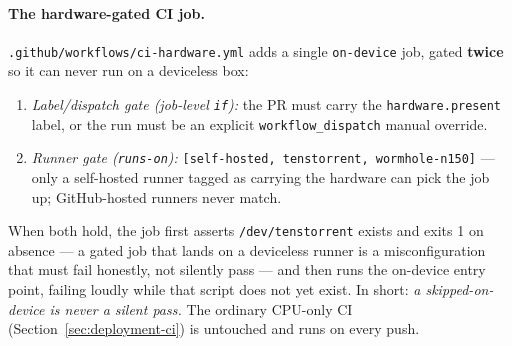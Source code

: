 \paragraph{The hardware-gated CI job.}
\texttt{.github/workflows/ci-hardware.yml} adds a single \texttt{on-device}
job, gated \textbf{twice} so it can never run on a deviceless box:
\begin{enumerate}[nosep]
  \item \emph{Label/dispatch gate (job-level \texttt{if}):} the PR must carry
        the \texttt{hardware.present} label, or the run must be an explicit
        \texttt{workflow\_dispatch} manual override.
  \item \emph{Runner gate (\texttt{runs-on}):}
        \texttt{[self-hosted, tenstorrent, wormhole-n150]} --- only a
        self-hosted runner tagged as carrying the hardware can pick the job
        up; GitHub-hosted runners never match.
\end{enumerate}
When both hold, the job first asserts \texttt{/dev/tenstorrent} exists and
exits 1 on absence --- a gated job that lands on a deviceless runner is a
misconfiguration that must fail honestly, not silently pass --- and then runs
the on-device entry point, failing loudly while that script does not yet
exist. In short: \emph{a skipped-on-device is never a silent pass.} The
ordinary CPU-only CI (Section~\ref{sec:deployment-ci}) is untouched and runs
on every push.
